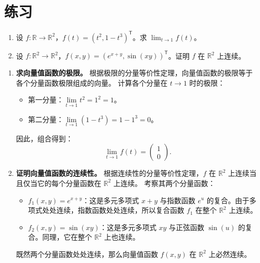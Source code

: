 \documentclass[lang=cn,11pt]{elegantbook}
\begin{document}
\section{练习}

\begin{exercise}[基础：向量值函数的极限与连续]
\begin{enumerate}
  \item[(1)] 设 $f:\mathbb R\to\mathbb R^2$，$f(t)=(t^2,1-t^3)^{\mathsf T}$。求 $\displaystyle\lim_{t\to 1}f(t)$。
  \item[(2)] 设 $f:\mathbb R^2\to\mathbb R^2$，$f(x,y)=(e^{x+y},\sin(xy))^{\mathsf T}$。证明 $f$ 在 $\mathbb R^2$ 上连续。
\end{enumerate}
\end{exercise}
\begin{solution}
\begin{enumerate}
  \item[(1)] \textbf{求向量值函数的极限。}
  根据极限的分量等价性定理，向量值函数的极限等于各个分量函数极限组成的向量。
  计算各个分量在 $t \to 1$ 时的极限：
  \begin{itemize}
    \item 第一分量：$\lim\limits_{t\to 1} t^2 = 1^2 = 1$。
    \item 第二分量：$\lim\limits_{t\to 1} (1-t^3) = 1 - 1^3 = 0$。
  \end{itemize}
  因此，组合得到：
  \[
  \lim_{t\to 1}f(t) = \begin{pmatrix} 1 \\ 0 \end{pmatrix}.
  \]

  \item[(2)] \textbf{证明向量值函数的连续性。}
  根据连续性的分量等价性定理，$f$ 在 $\mathbb R^2$ 上连续当且仅当它的每个分量函数在 $\mathbb R^2$ 上连续。
  考察其两个分量函数：
  \begin{itemize}
    \item $f_1(x,y) = e^{x+y}$：这是多元多项式 $x+y$ 与指数函数 $e^u$ 的复合。由于多项式处处连续，指数函数处处连续，所以复合函数 $f_1$ 在整个 $\mathbb R^2$ 上连续。
    \item $f_2(x,y) = \sin(xy)$：这是多元多项式 $xy$ 与正弦函数 $\sin(u)$ 的复合。同理，它在整个 $\mathbb R^2$ 上也连续。
  \end{itemize}
  既然两个分量函数处处连续，那么向量值函数 $f(x,y)$ 在 $\mathbb R^2$ 上必然连续。
\end{enumerate}
\end{solution}
\end{document}
